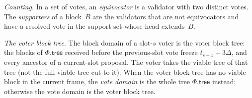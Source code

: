 \documentclass{article}
\newcommand{\Fr}{\Phi}
\newcommand{\tree}{\mathsf{tree}}
\begin{document}
\emph{Counting.}  In a set of votes, an \emph{equivocator} is a validator
with two distinct votes.  The \emph{supporters} of a block~$B$ are the
validators that are not equivocators and have a resolved vote in the
support set whose head extends~$B$.

\emph{The voter block tree.}  The block domain of a slot-$s$ voter is the
voter block tree: the blocks of $\Fr.\tree$ received before the
previous-slot vote freeze $t_{s-1}+3\Delta$, and every ancestor of a
current-slot proposal.  The voter takes the viable tree of that tree (not the
full viable tree cut to it).  When the voter block tree has no viable
block in the current frame, the \emph{vote domain} is the whole tree
$\Fr.\tree$ instead; otherwise the vote domain is the voter block tree.

\label{alg:ac-views}
\nopagebreak
\end{document}
